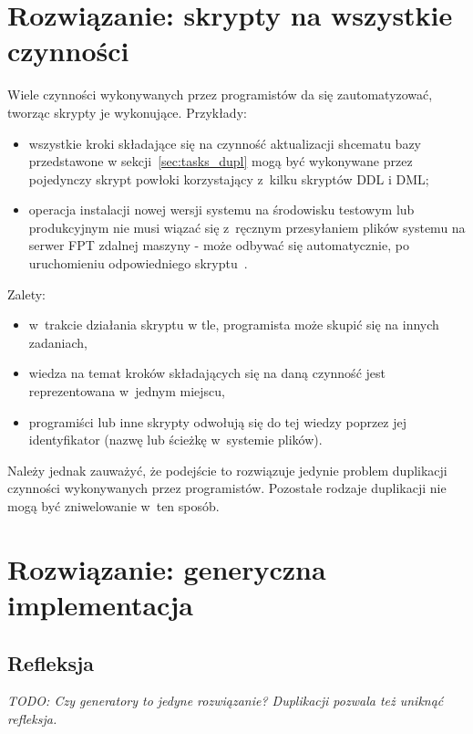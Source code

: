 \section{Rozwiązanie: skrypty na wszystkie czynności}

Wiele czynności wykonywanych przez programistów da się zautomatyzować, tworząc skrypty je wykonujące.
Przykłady:

\begin{itemize}
 \item wszystkie kroki składające się na czynność aktualizacji shcematu bazy przedstawone w sekcji~\ref{sec:tasks_dupl} mogą być wykonywane przez pojedynczy skrypt powłoki korzystający z~kilku skryptów DDL i DML;
 \item operacja instalacji nowej wersji systemu na środowisku testowym lub produkcyjnym nie musi wiązać się z~ręcznym przesyłaniem plików systemu na serwer FPT zdalnej maszyny - może odbywać się automatycznie, po uruchomieniu odpowiedniego skryptu~\cite{cont_delivery}.
\end{itemize}


Zalety:

\begin{itemize}
 \item w~trakcie działania skryptu w tle, programista może skupić się na innych zadaniach,
 \item wiedza na temat kroków składających się na daną czynność jest reprezentowana w~jednym miejscu,
 \item programiści lub inne skrypty odwołują się do tej wiedzy poprzez jej identyfikator (nazwę lub ścieżkę w~systemie plików).
\end{itemize}

Należy jednak zauważyć, że podejście to rozwiązuje jedynie problem duplikacji czynności wykonywanych przez programistów.
Pozostałe rodzaje duplikacji nie mogą być zniwelowanie w~ten sposób.



\section{Rozwiązanie: generyczna implementacja}

\subsection{Refleksja}
\emph{TODO: Czy generatory to jedyne rozwiązanie? Duplikacji pozwala też uniknąć refleksja.}


